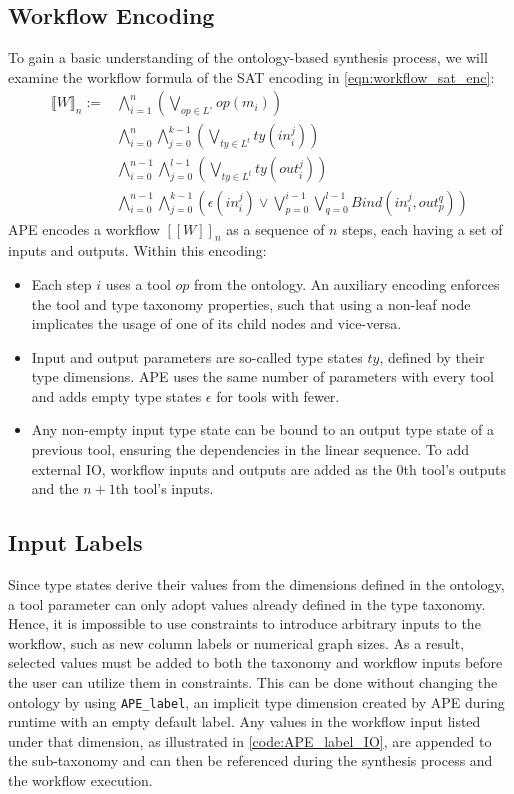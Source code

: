 \subsection{Workflow Encoding}
To gain a basic understanding of the ontology-based synthesis process, we will examine the workflow formula of the SAT encoding in \autoref{eqn:workflow_sat_enc}:
\begin{align}
    \label{eqn:workflow_sat_enc}
    \llbracket W \rrbracket_n := & \bigwedge_{i=1}^{n}\left(\bigvee_{op\in L^\circ} op(m_i)\right)\\
    & \bigwedge_{i=0}^{n}\bigwedge_{j=0}^{k-1}\left(\bigvee_{ty\in L^t} ty(in_i^j)\right)\nonumber\\
    & \bigwedge_{i=0}^{n-1}\bigwedge_{j=0}^{l-1}\left(\bigvee_{ty\in L^t} ty(out_i^j)\right)\nonumber\\
    & \bigwedge_{i=0}^{n-1}\bigwedge_{j=0}^{k-1}\left(\epsilon(in_i^j)\vee\bigvee_{p=0}^{i-1}\bigvee_{q=0}^{l-1}Bind(in_i^j, out_p^q)\right)\nonumber
\end{align}
APE encodes a workflow $[[W]]_n$ as a sequence of \(n\) steps, each having a set of inputs and outputs. Within this encoding:
\begin{itemize}
    \item Each step \(i\) uses a tool \(op\) from the ontology. An auxiliary encoding enforces the tool and type taxonomy properties, such that using a non-leaf node implicates the usage of one of its child nodes and vice-versa.
    \item Input and output parameters are so-called type states \(ty\), defined by their type dimensions. APE uses the same number of parameters with every tool and adds empty type states \(\epsilon\) for tools with fewer.
    \item Any non-empty input type state can be bound to an output type state of a previous tool, ensuring the dependencies in the linear sequence. To add external IO, workflow inputs and outputs are added as the \(0\)th tool's outputs and the \(n+1\)th tool's inputs.
\end{itemize}

\subsection{Input Labels}\label{sec:input_labels}
Since type states derive their values from the dimensions defined in the ontology, a tool parameter can only adopt values already defined in the type taxonomy. Hence, it is impossible to use constraints to introduce arbitrary inputs to the workflow, such as new column labels or numerical graph sizes. As a result, selected values must be added to both the taxonomy and workflow inputs before the user can utilize them in constraints. This can be done without changing the ontology by using \verb|APE_label|, an implicit type dimension created by APE during runtime with an empty default label. Any values in the workflow input listed under that dimension, as illustrated in \autoref{code:APE_label_IO}, are appended to the sub-taxonomy and can then be referenced during the synthesis process and the workflow execution.

